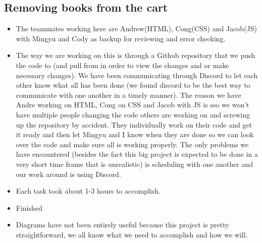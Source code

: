 \documentclass[12pt]{article}
\begin{document}
		\subsection{Removing books from the cart}
		\begin{itemize}

		\item The teammates working here are Andrew(HTML), Cong(CSS) and Jacob(JS) with Mingyu and Cody as backup for reviewing and error checking.

		\item The way we are working on this is through a Github repository that we push the code to (and pull from in order to view the changes and or make necessary changes).  We have been communicating through Discord to let each other know what all has been done (we found discord to be the best way to communicate with one another in a timely manner).  The reason we have Andre working on HTML, Cong on CSS and Jacob with JS is sso we won’t have multiple people changing the code others are working on and screwing up the repository by accident.  They individually work on their code and get it ready and then let Mingyu and I know when they are done so we can look over the code and make sure all is working properly.  The only problems we have encountered (besides the fact this big project is expected to be done in a very short time frame that is unrealistic) is scheduling with one another and our work around is using Discord.

		\item Each task took about 1-3 hours to accomplish.

		\item Finished

		\item Diagrams have not been entirely useful because this project is pretty straightforward, we all know what we need to accomplish and how we will.

		\end{itemize}
\end{document}
